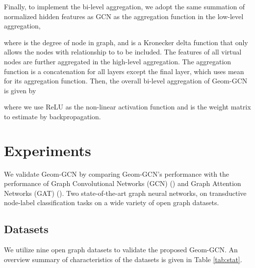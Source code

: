 \documentclass{article} \usepackage{iclr2020_conference,times}
\begin{document}
Finally, to implement the bi-level aggregation, we adopt the same summation of normalized hidden features as GCN \citep{DBLP:conf/iclr/KipfW17} as the aggregation function  in the low-level aggregation,

where  is the degree of node  in graph, and  is a Kronecker delta function that only allows the nodes with relationship  to  to be included.
The features of all virtual nodes  are further aggregated in the high-level aggregation. The aggregation function  is a concatenation  for all layers except the final layer, which uses mean for its aggregation function.
Then, the overall bi-level aggregation of Geom-GCN is given by

where we use ReLU as the non-linear activation function  and  is the weight matrix to estimate by backpropagation.

\vspace{-1mm}
\section{Experiments}
\vspace{-1mm}

We validate Geom-GCN by comparing Geom-GCN's performance with the performance of Graph Convolutional Networks (GCN) (\cite{DBLP:conf/iclr/KipfW17}) and Graph Attention Networks (GAT) (\cite{DBLP:journals/corr/abs-1710-10903}).
Two state-of-the-art graph neural networks, on transductive node-label  classification tasks on a wide variety of open graph datasets.

\vspace{-1mm}
\subsection{Datasets}
\vspace{-1mm}
We utilize nine open graph datasets to validate the proposed Geom-GCN.
An overview summary of characteristics of the datasets is given in Table \ref{tab:stat}.
\end{document}

